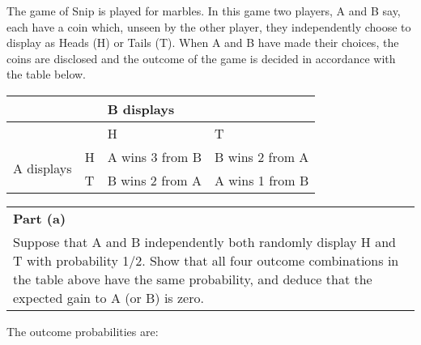 \documentclass[a4paper,12pt]{article}
\begin{document}
	\large 
\noindent The game of Snip is played for marbles.  In this game two players, A and B say, each have a coin which, unseen by the other player, they independently choose to display as Heads (H) or Tails (T).  When A and B have made their choices, the coins are disclosed and the outcome of the game is decided in accordance with the table below.
	
	\begin{center}
		\begin{tabular}{|ll|l|l|}\hline
			\multicolumn{2}{|l}{}   & \multicolumn{2}{l|}{B displays} \\ \hline
			\multicolumn{2}{|l|}{}   & H      & T      \\ 
			\multirow{2}{*}{A displays} & H & A wins 3 from B & B wins 2 from A \\ 
			& T & B wins 2 from A & A wins 1 from B \\ \hline
		\end{tabular}
	\end{center}
	
	
	\begin{table}[ht!]
		\centering
		\begin{tabular}{|p{15cm}|}
			\hline  \large 
			\noindent \textbf{Part (a)} \\ \large Suppose that A and B independently both randomly display H and T with probability 1/2.  Show that all four outcome combinations in the table above have the same probability, and deduce that the expected gain to A (or B) is zero. 
			\\ \hline
		\end{tabular}
	\end{table}
	
	\large 
	\noindent The outcome probabilities are:
	
\end{document}
